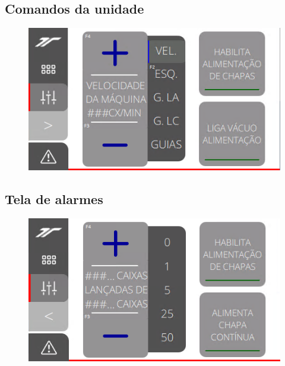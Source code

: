 \newpage
\thispagestyle{fancy}
\vspace*{40 pt}
\subsection{\small Comandos da unidade}
\vspace*{\fill}
\begin{figure}[h]
    \centering
    \includegraphics{src/imagesICV/11-KTP400-Feeder/4.png}
\end{figure}
\vspace*{\fill}

\newpage
\thispagestyle{fancy}
\vspace*{40 pt}
\subsection{\small Tela de alarmes}
\vspace*{\fill}
\begin{figure}[h]
    \centering
    \includegraphics{src/imagesICV/11-KTP400-Feeder/10.png}
\end{figure}
\vspace*{\fill}
